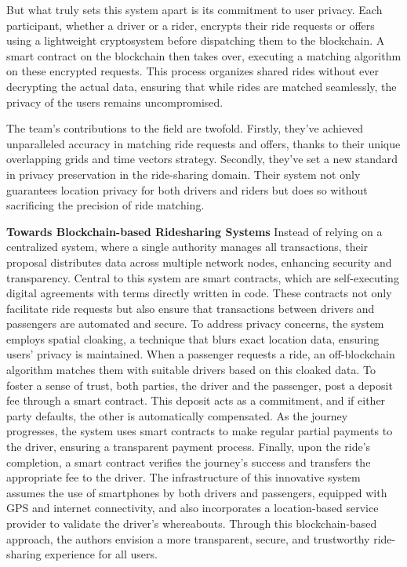 But what truly sets this system apart is its commitment to user privacy. Each participant, whether a driver or a rider, encrypts their ride requests or offers using a lightweight cryptosystem before dispatching them to the blockchain. A smart contract on the blockchain then takes over, executing a matching algorithm on these encrypted requests. This process organizes shared rides without ever decrypting the actual data, ensuring that while rides are matched seamlessly, the privacy of the users remains uncompromised.

The team's contributions to the field are twofold. Firstly, they've achieved unparalleled accuracy in matching ride requests and offers, thanks to their unique overlapping grids and time vectors strategy. Secondly, they've set a new standard in privacy preservation in the ride-sharing domain. Their system not only guarantees location privacy for both drivers and riders but does so without sacrificing the precision of ride matching.

\textbf{Towards Blockchain-based Ridesharing Systems}
Instead of relying on a centralized system, where a single authority manages all transactions, their proposal distributes data across multiple network nodes, enhancing security and transparency. Central to this system are smart contracts, which are self-executing digital agreements with terms directly written in code. These contracts not only facilitate ride requests but also ensure that transactions between drivers and passengers are automated and secure. To address privacy concerns, the system employs spatial cloaking, a technique that blurs exact location data, ensuring users' privacy is maintained. When a passenger requests a ride, an off-blockchain algorithm matches them with suitable drivers based on this cloaked data. To foster a sense of trust, both parties, the driver and the passenger, post a deposit fee through a smart contract. This deposit acts as a commitment, and if either party defaults, the other is automatically compensated. As the journey progresses, the system uses smart contracts to make regular partial payments to the driver, ensuring a transparent payment process. Finally, upon the ride's completion, a smart contract verifies the journey's success and transfers the appropriate fee to the driver. The infrastructure of this innovative system assumes the use of smartphones by both drivers and passengers, equipped with GPS and internet connectivity, and also incorporates a location-based service provider to validate the driver's whereabouts. Through this blockchain-based approach, the authors envision a more transparent, secure, and trustworthy ride-sharing experience for all users.

